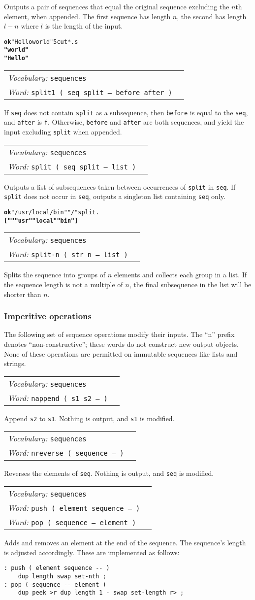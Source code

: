 \documentclass{book}
\newcommand{\vocabulary}[1]{\emph{Vocabulary:} \texttt{#1}&\\}
\newcommand{\ordinaryword}[2]{\index{\texttt{#1}}\emph{Word:} \texttt{#2}&\\}
\newcommand{\wordtable}[1]{


\begin{tabularx}{12cm}{lX}
\hline
#1
\hline
\end{tabularx}

}
\begin{document}
Outputs a pair of sequences that equal the original sequence excluding the $n$th element, when appended. The first sequence has length $n$, the second has length $l-n$ where $l$ is the length of the input.
\begin{alltt}
\textbf{ok} "Hello world" 5 cut* .s
\textbf{"world"
"Hello"}
\end{alltt}
\wordtable{
\vocabulary{sequences}
\ordinaryword{split1}{split1~( seq split -- before after )}
}
If \texttt{seq} does not contain \texttt{split} as a subsequence, then \texttt{before} is equal to the \texttt{seq}, and \texttt{after} is \texttt{f}. Otherwise, \texttt{before} and \texttt{after} are both sequences, and yield the input excluding \texttt{split} when appended.
\wordtable{
\vocabulary{sequences}
\ordinaryword{split}{split~( seq split -- list )}
}
Outputs a list of subsequences taken between occurrences of \texttt{split} in \texttt{seq}. If \texttt{split} does not occur in \texttt{seq}, outputs a singleton list containing \texttt{seq} only.
\begin{alltt}
\textbf{ok} "/usr/local/bin" "/" split .
\textbf{[ "" "usr" "local" "bin" ]}
\end{alltt}
\wordtable{
\vocabulary{sequences}
\ordinaryword{split-n}{split-n~( str n -- list )}
}
Splits the sequence into groups of $n$ elements and collects each group in a list. If the sequence length is not a multiple of $n$, the final subsequence in the list will be shorter than $n$.

\subsubsection{Imperitive operations}

The following set of sequence operations modify their inputs. The ``n'' prefix denotes ``non-constructive''; these words do not construct new output objects. None of these operations are permitted on immutable sequences like lists and strings.

\wordtable{
\vocabulary{sequences}
\ordinaryword{nappend}{nappend ( s1 s2 -- )}
}
Append \texttt{s2} to \texttt{s1}. Nothing is output, and \texttt{s1} is modified.
\wordtable{
\vocabulary{sequences}
\ordinaryword{nreverse}{nreverse ( sequence -- )}
}
Reverses the elements of \texttt{seq}. Nothing is output, and \texttt{seq} is modified.
\wordtable{
\vocabulary{sequences}
\ordinaryword{push}{push ( element sequence -- )}
\ordinaryword{pop}{pop ( sequence -- element )}
}

Adds and removes an element at the end of the sequence. The sequence's length is adjusted accordingly. These are implemented as follows:
\begin{verbatim}
: push ( element sequence -- )
    dup length swap set-nth ;
: pop ( sequence -- element )
    dup peek >r dup length 1 - swap set-length r> ;
\end{verbatim}
\end{document}
